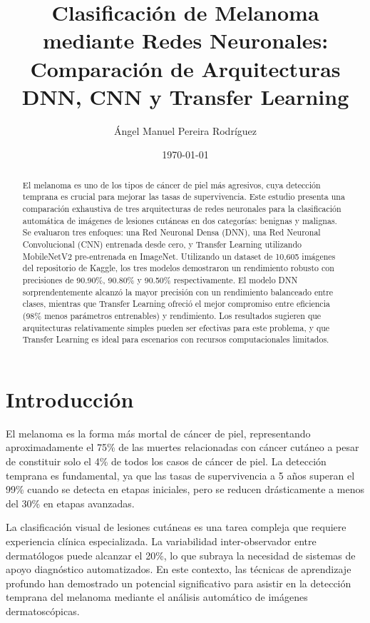 \documentclass[11pt, a4paper]{article}
\title{\textbf{Clasificación de Melanoma mediante Redes Neuronales:\\Comparación de Arquitecturas DNN, CNN y Transfer Learning}}
\author{Ángel Manuel Pereira Rodríguez}
\date{\today}
\begin{document}
\maketitle

\begin{abstract}
El melanoma es uno de los tipos de cáncer de piel más agresivos, cuya detección temprana es crucial para mejorar las tasas de supervivencia. Este estudio presenta una comparación exhaustiva de tres arquitecturas de redes neuronales para la clasificación automática de imágenes de lesiones cutáneas en dos categorías: benignas y malignas. Se evaluaron tres enfoques: una Red Neuronal Densa (DNN), una Red Neuronal Convolucional (CNN) entrenada desde cero, y Transfer Learning utilizando MobileNetV2 pre-entrenada en ImageNet. Utilizando un dataset de 10,605 imágenes del repositorio de Kaggle, los tres modelos demostraron un rendimiento robusto con precisiones de 90.90\%, 90.80\% y 90.50\% respectivamente. El modelo DNN sorprendentemente alcanzó la mayor precisión con un rendimiento balanceado entre clases, mientras que Transfer Learning ofreció el mejor compromiso entre eficiencia (98\% menos parámetros entrenables) y rendimiento. Los resultados sugieren que arquitecturas relativamente simples pueden ser efectivas para este problema, y que Transfer Learning es ideal para escenarios con recursos computacionales limitados.
\end{abstract}

\tableofcontents
\listoftables
\clearpage

\section{Introducción}

El melanoma es la forma más mortal de cáncer de piel, representando aproximadamente el 75\% de las muertes relacionadas con cáncer cutáneo a pesar de constituir solo el 4\% de todos los casos de cáncer de piel. La detección temprana es fundamental, ya que las tasas de supervivencia a 5 años superan el 99\% cuando se detecta en etapas iniciales, pero se reducen drásticamente a menos del 30\% en etapas avanzadas.

La clasificación visual de lesiones cutáneas es una tarea compleja que requiere experiencia clínica especializada. La variabilidad inter-observador entre dermatólogos puede alcanzar el 20\%, lo que subraya la necesidad de sistemas de apoyo diagnóstico automatizados. En este contexto, las técnicas de aprendizaje profundo han demostrado un potencial significativo para asistir en la detección temprana del melanoma mediante el análisis automático de imágenes dermatoscópicas.
\end{document}
